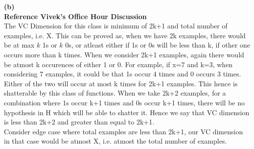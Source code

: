 \documentclass[11pt]{article}
\begin{document}
{\bf (b)}\\ {\bf Reference Vivek's Office Hour Discussion}\\
The VC Dimension for this class is minimum of 2k+1 and total number of examples, i.e. X. This can be proved as, when we have 2k examples, there would be at max $k$ 1s or $k$ 0s, or atleast either if 1s or 0s will be less than k, if other one occurs more than k times. When we consider 2k+1 examples, again there would be atmost k occurences of either 1 or 0. For example, if x=7 and k=3, when considering 7 examples, it could be that 1s occur 4 times and 0 occurs 3 times. Either of the two will occur at most k times for 2k+1 examples. This hence is shatterable by this class of functions. When we take 2k+2 examples, for a combination where 1s occur k+1 times and 0s occur k+1 times, there will be no hypothesis in H which will be able to shatter it. Hence we say that VC dimension is less than 2k+2 and greater than equal to 2k+1. 
\\ Consider edge case where total examples are less than 2k+1, our VC dimension in that case would be atmost X, i.e. atmost the total number of examples.\\[10pt]
\end{document}
